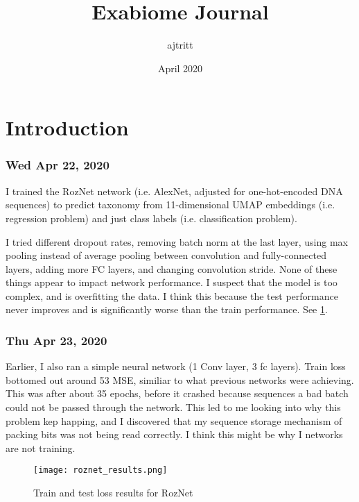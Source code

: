 \documentclass{article}
\title{Exabiome Journal}
\author{ajtritt }
\date{April 2020}
\begin{document}
\maketitle

\section{Introduction}

\subsubsection*{Wed Apr 22, 2020}

I trained the RozNet network (i.e. AlexNet, adjusted for one-hot-encoded DNA sequences) to predict taxonomy
from 11-dimensional UMAP embeddings (i.e. regression problem) and just class labels (i.e. classification problem).

I tried different dropout rates, removing batch norm at the last layer, using max pooling instead of average pooling
between convolution and fully-connected layers, adding more FC layers, and changing convolution stride. None of these
things appear to impact network performance. I suspect that the model is too complex, and is overfitting the data. I
think this because the test performance never improves and is significantly worse than the train performance. See
\ref{fig:roznet_train_test}.

\subsubsection*{Thu Apr 23, 2020}
Earlier, I also ran a simple neural network (1 Conv layer, 3 fc layers). Train loss bottomed out around 53 MSE, similiar
to what previous networks were achieving. This was after about 35 epochs, before it crashed because sequences a bad
batch could not be passed through the network. This led to me looking into why this problem kep happing, and I discovered
that my sequence storage mechanism of packing bits was not being read correctly. I think this might be why I networks are
not training.


\begin{figure}
  \texttt{[image: roznet\_results.png]}
  \caption{Train and test loss results for RozNet}
  \label{fig:roznet_train_test}
\end{figure}
\end{document}

